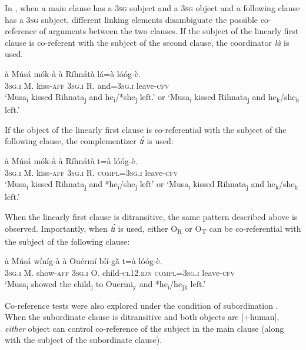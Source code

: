 \documentclass[output=paper]{langsci/langscibook}
\begin{document}
In , when a main clause has a 3\textsc{sg} subject and a 3\textsc{sg} object and a following clause has a 3\textsc{sg} subject, different linking elements disambiguate the possible co-reference of arguments between the two clauses. If the subject of the linearly first clause is co-referent with the subject of the second clause, the coordinator \textit{là} is used.

\ea
\label{ex:37.pacchiarotti}
\gll à    Músá  mók-à    à    Ríhnátà  lá=à      lóóg-è.\\
\textsc{3sg.i}    M.  kiss-\textsc{aff}  \textsc{3sg.i} R.    and=\textsc{3sg.i}    leave-\textsc{cfv}\\
\glt `Musa\textsubscript{i} kissed Rihnata\textsubscript{j} and he\textsubscript{i}/*she\textsubscript{j} left.' or `Musa\textsubscript{i} kissed Rihnata\textsubscript{j} and he\textsubscript{k}/she\textsubscript{k} left.'
\z

If the object of the linearly first clause is co-referential with the subject of the following clause, the complementizer \textit{tɪ́} is used:

\ea
\label{ex:38.pacchiarotti}
\gll à    Músá  mók-à    à    Ríhnátà  t=à        lóóg-è.\\
\textsc{3sg.i}    M.  kiss-\textsc{aff}  \textsc{3sg.i}    R.    \textsc{compl=3sg.i}      leave-\textsc{cfv}\\
\glt `Musa\textsubscript{i} kissed Rihnata\textsubscript{j} and *he\textsubscript{i}/she\textsubscript{j} left' or `Musa\textsubscript{i} kissed Rihnata\textsubscript{j} and he\textsubscript{k}/she\textsubscript{k} left.'
\z

When the linearly first clause is ditransitive, the same pattern described above is observed. Importantly, when \textit{tɪ́} is used, either O\textsubscript{R} or O\textsubscript{T} can be co-referential with the subject of the following clause:

\ea
\label{ex:39.pacchiarotti}
\gll à    Músá  wíníg-à  à    Ouérmí  bíí-g\`{ã}  t=à      lóóg-è. \\     
\textsc{3sg.i}    M.  show-\textsc{aff}  \textsc{3sg.i}    O.    child-\textsc{cl12.idn} \textsc{  compl=3sg.i}        leave-\textsc{cfv}\\
\glt `Musa\textsubscript{i}  showed the child\textsubscript{j} to Ouermi\textsubscript{y} and *he\textsubscript{i}/he\textsubscript{jk} left.'
\z

Co-reference tests were also explored under the condition of subordination . When the subordinate clause is ditransitive and both objects are [+human], \textit{either} object can control co-reference of the subject in the main clause (along with the subject of the subordinate clause).
\end{document}
